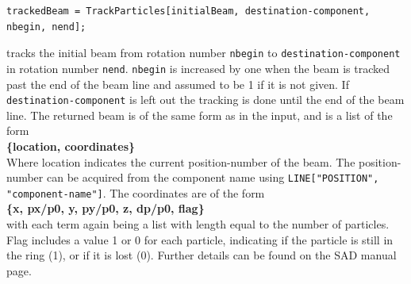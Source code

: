 \documentclass{article}
\begin{document}
\begin{lstlisting}
trackedBeam = TrackParticles[initialBeam, destination-component, nbegin, nend];
\end{lstlisting}
tracks the initial beam from rotation number \texttt{nbegin} to \texttt{destination-component} in rotation number \texttt{nend}. \texttt{nbegin} is increased by one when the beam is tracked past the end of the beam line and assumed to be 1 if it is not given. If \texttt{destination-component} is left out the tracking is done until the end of the beam line. The returned beam is of the same form as in the input, and is a list of the form
\\
\textbf{\{location, coordinates\}}
\\
Where location indicates the current position-number of the beam. The position-number can be acquired from the component name using \texttt{LINE["POSITION", "component-name"]}. The coordinates are of the form 
\\
\textbf{\{x, px/p0, y, py/p0, z, dp/p0, flag\}}
\\
with each term again being a list with length equal to the number of particles. Flag includes a value 1 or 0 for each particle, indicating if the particle is still in the ring (1), or if it is lost (0).
Further details can be found on the SAD manual page.
\end{document}
